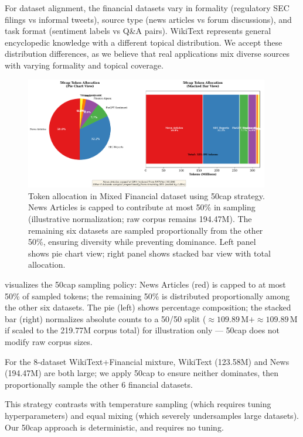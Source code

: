For dataset alignment, the financial datasets vary in formality (regulatory SEC filings vs informal tweets), source type (news articles vs forum discussions), and task format (sentiment labels vs Q\&A pairs). WikiText represents general encyclopedic knowledge with a different topical distribution. We accept these distribution differences, as we believe that real applications mix diverse sources with varying formality and topical coverage.

\begin{figure}[h]
\centering
\includegraphics[width=0.95\textwidth]{figures/diagram_50cap.png}
\caption[50cap Mixture Strategy Visualization]{Token allocation in Mixed Financial dataset using 50cap strategy. News Articles is capped to contribute at most 50\% in sampling (illustrative normalization; raw corpus remains 194.47M). The remaining six datasets are sampled proportionally from the other 50\%, ensuring diversity while preventing dominance. Left panel shows pie chart view; right panel shows stacked bar view with total allocation.}
\label{fig:diagram_50cap}
\end{figure}

 visualizes the 50cap sampling policy: News Articles (red) is capped to at most 50\% of sampled tokens; the remaining 50\% is distributed proportionally among the other six datasets. The pie (left) shows percentage composition; the stacked bar (right) normalizes absolute counts to a 50/50 split (\(\approx\!109.89\,\text{M}+\approx\!109.89\,\text{M}\) if scaled to the 219.77M corpus total) for illustration only — 50cap does not modify raw corpus sizes.

For the 8-dataset WikiText+Financial mixture, WikiText (123.58M) and News (194.47M) are both large; we apply 50cap to ensure neither dominates, then proportionally sample the other 6 financial datasets.

This strategy contrasts with temperature sampling (which requires tuning hyperparameters) and equal mixing (which severely undersamples large datasets). Our 50cap approach is deterministic, and requires no tuning.


